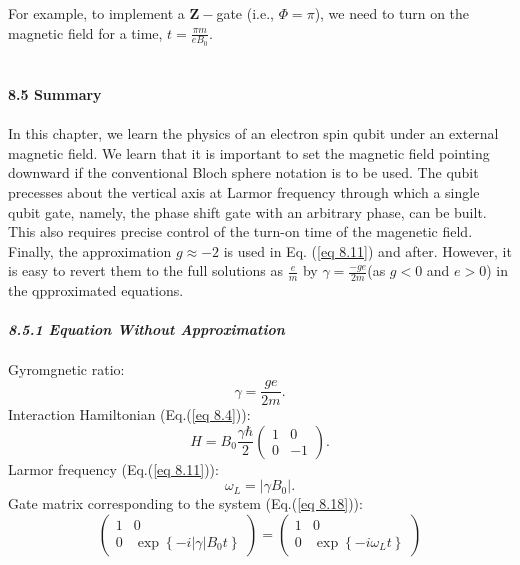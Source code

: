 \documentclass{article}
\newcommand{\bfit}[1]{\textit{\textbf{#1}}}
\begin{document}
For example, to implement a $\boldsymbol{Z}-$gate (i.e., $\varPhi=\pi$), we need to turn on the magnetic field
for a time, $t=\frac{\pi m}{eB_0}$.\\\\\\
\textbf{\large 8.5 Summary}\\\\
In this chapter, we learn the physics of an electron spin qubit under an external
magnetic field. We learn that it is important to set the magnetic field pointing downward
if the conventional Bloch sphere notation is to be used. The qubit precesses about the vertical
axis at Larmor frequency through which a single qubit gate, namely, the phase shift gate with an 
arbitrary phase, can be built. This also requires precise control of the turn-on time of the magenetic
field. Finally, the approximation $g\approx-2$ is used in Eq. (\ref{eq 8.11}) and after. However,
it is easy to revert them to the full solutions as $\frac{e}{m}$ by $\gamma=\frac{-ge}{2m} $(as $g<0$ and $e>0$) 
in the qpproximated equations.\\\\
\bfit{\large 8.5.1 Equation Without Approximation}\\\\
Gyromgnetic ratio:
\begin{equation}\label{eq 8.22}
    \gamma=\frac{ge}{2m}.\tag{8.22}
\end{equation}
Interaction Hamiltonian (Eq.(\ref{eq 8.4})):
\begin{equation}\label{eq 8.23}
    H=B_0\frac{\gamma\hbar}{2}\begin{pmatrix}
        1&0\\0&-1
    \end{pmatrix}.\tag{8.23}
\end{equation}\label{eq. 24}
Larmor frequency (Eq.(\ref{eq 8.11})):
\begin{equation}\label{eq 8.24}
    \omega_L=|\gamma B_0|.\tag{8.24}
\end{equation}
Gate matrix corresponding to the system (Eq.(\ref{eq 8.18})):
\begin{equation}\label{eq 8.25}
    \begin{pmatrix}
        1&0\\0&\exp\left\{-i|\gamma|B_0t\right\}
    \end{pmatrix}=
    \begin{pmatrix}
        1&0\\0&\exp\left\{-i\omega_Lt\right\}
    \end{pmatrix}\tag{8.25}
\end{equation}
\end{document}
